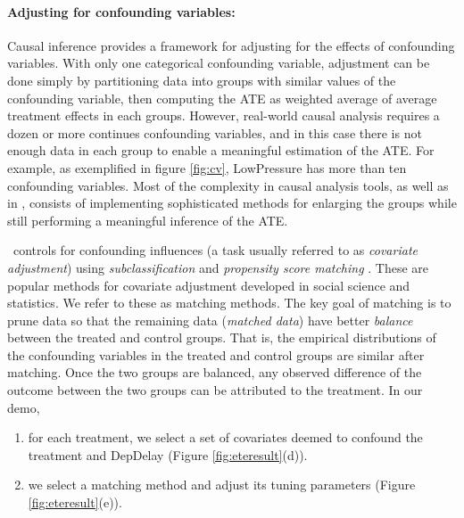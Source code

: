 
 \paragraph{\bf Adjusting for confounding variables:}
Causal inference provides a framework for adjusting for the effects of
confounding variables.
 With only one categorical confounding variable, adjustment can be
 done simply by partitioning data into
 groups with similar values of the confounding variable, then
 computing the ATE as  weighted average of average treatment effects in each groups. However, real-world causal analysis requires a dozen or more continues confounding variables, and in this case there is not enough data in each group to enable a meaningful estimation of the ATE. For example, as exemplified in figure \ref{fig:cv}, LowPressure has more than ten confounding variables.  Most of the complexity in causal analysis tools, as well as in \GSQL, consists of implementing sophisticated methods for enlarging the groups while still performing a meaningful inference of the ATE.

\GSQL\ controls for confounding influences (a task usually referred to
as {\em covariate adjustment}) using {\em subclassification} and {\it propensity score matching} \cite{Rubin1983b,IacKinPor09,rosenbaum1984reducing}.
These are popular methods for covariate adjustment developed in social
science and statistics. We refer to these as matching methods.
The key goal of matching is to prune data so that
the remaining data ({\em matched data}) have better \emph{balance}
between the treated and control groups. That is, the empirical
distributions of the confounding variables in the treated and control
groups are similar after matching.
Once the two groups are balanced, any observed difference of the
outcome between the two groups can be attributed to the treatment. In
our demo,
     \begin{enumerate}
      \item for each treatment, we select a set of covariates deemed to confound the treatment and DepDelay (Figure \ref{fig:eteresult}(d)).
      \item we select a matching method and adjust its tuning parameters (Figure \ref{fig:eteresult}(e)).
\end{enumerate}


